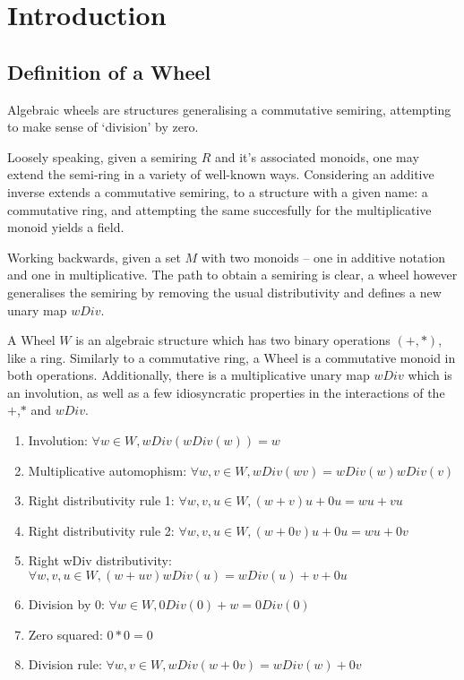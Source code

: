 %
\chapter{Introduction}
\section{Definition of a Wheel}
Algebraic wheels are structures generalising a commutative semiring, attempting to make sense of  `division' by zero. \par
Loosely speaking, given a semiring $R$ and it's associated monoids, one may extend the semi-ring in a variety of well-known ways. Considering an additive inverse extends a commutative semiring, to a structure with a given name: a commutative ring, and attempting the same succesfully for the multiplicative monoid yields a field. \par
Working backwards, given a set $M$ with two monoids -- one in additive notation and one in multiplicative. The path to obtain a semiring is clear,  a wheel however generalises the semiring by removing the usual distributivity and defines a new unary map $wDiv$.
\begin{definition}
  \label{def:Wheel}
  \leanok
A Wheel $W$ is an algebraic structure which has two binary operations $(+,*)$, like a ring.
Similarly to a commutative ring, a Wheel is a commutative monoid in both operations. Additionally,
there is a multiplicative unary map $wDiv$  which is an involution, as well as a few idiosyncratic
properties in the interactions of the $+$,$*$ and $wDiv$.
  \begin{enumerate}
  \item Involution: $\forall w \in W, wDiv(wDiv(w)) = w$ 
  \item Multiplicative automophism: $\forall w, v \in W, wDiv(wv) = wDiv(w)wDiv(v)$
  \item Right distributivity rule 1: $\forall w, v, u \in W, (w + v)u + 0u= wu + vu$
  \item Right distributivity rule 2: $\forall w, v, u \in W, (w + 0v)u + 0u= wu + 0v$
  \item Right wDiv distributivity: $\forall w, v, u \in W, (w + uv)wDiv(u) = wDiv(u)+ v+0u$
  \item Division by 0: $\forall w \in W, 0Div(0) + w = 0Div(0)$
  \item Zero squared: $0*0 = 0$
  \item Division rule: $\forall w, v \in W, wDiv(w + 0v) = wDiv(w) +0v$
  \end{enumerate}
\end{definition}
